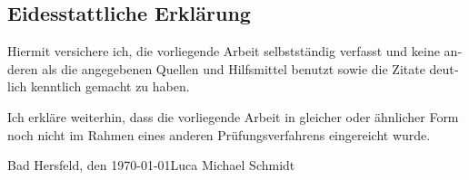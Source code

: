 
\begin{otherlanguage}{ngerman}
    \thispagestyle{empty}
    \section*{Eidesstattliche Erklärung}

    Hiermit versichere ich, die vorliegende Arbeit selbstständig verfasst und
    keine anderen als die angegebenen Quellen und Hilfsmittel benutzt sowie
    die Zitate deutlich kenntlich gemacht zu haben.

    Ich erkläre weiterhin, dass die vorliegende Arbeit in gleicher oder ähnlicher
    Form noch nicht im Rahmen eines anderen Prüfungsverfahrens eingereicht wurde.

    \vfill

    {\small Bad Hersfeld, den \today \hfill Luca Michael Schmidt}

\end{otherlanguage}
